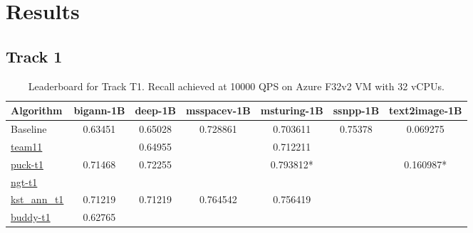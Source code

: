 \section{Results}
\subsection{Track 1}
\begin{table}
  \caption{Leaderboard for Track T1. Recall achieved at 10000 QPS on Azure F32v2 VM with 32 vCPUs.}
  
  \begin{tabular}{l|c|c|c|c|c|c}
    \hline
    Algorithm & bigann-1B & deep-1B & msspacev-1B & msturing-1B & ssnpp-1B & text2image-1B  \\
    \hline
    Baseline  &	0.63451   & 0.65028 & 0.728861 & 0.703611 & 0.75378 & 0.069275       \\
    \hline
    \href{https://github.com/harsha-simhadri/big-ann-benchmarks/pull/58}{team11}     & & 0.64955 & & 0.712211 & & \\
    \href{https://github.com/harsha-simhadri/big-ann-benchmarks/pull/60}{puck-t1}    & 0.71468   & 0.72255 & & 0.793812* & & 0.160987*    \\
    \href{https://github.com/harsha-simhadri/big-ann-benchmarks/pull/66}{ngt-t1}     & & & & & & \\
    \href{https://github.com/harsha-simhadri/big-ann-benchmarks/pull/69}{kst\_ann\_t1} &	0.71219	  & 0.71219 & 0.764542 & 0.756419 & & \\
    \href{https://github.com/harsha-simhadri/big-ann-benchmarks/pull/71}{buddy-t1}   &	0.62765 & & & & \\
    \hline
  \end{tabular}
\end{table}


